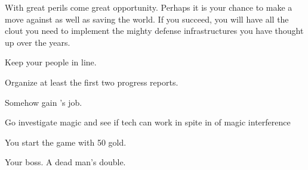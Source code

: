 \documentclass[char]{guildcamp3}
\begin{document}
With great perils come great opportunity. Perhaps it is your chance to make a move against \cPoliOne{} as well as saving the world. If you succeed, you will have all the clout you need to implement the mighty defense infrastructures you have thought up over the years.








\begin{itemz}[Goals]
  \item Keep your people in line.
  \item Organize at least the first two progress reports.
  \item Somehow gain \cPoliOne{}'s job.
  \item Go investigate magic and see if tech can work in spite in of magic interference
\end{itemz}

\begin{itemz}[Notes]
	\item You start the game with 50 gold. 
\end{itemz}

\begin{contacts}
  \contact{\cPoliOne{}} Your boss.
  \contact{\cRogueOne{}} A dead man's double.
\end{contacts}
\end{document}
